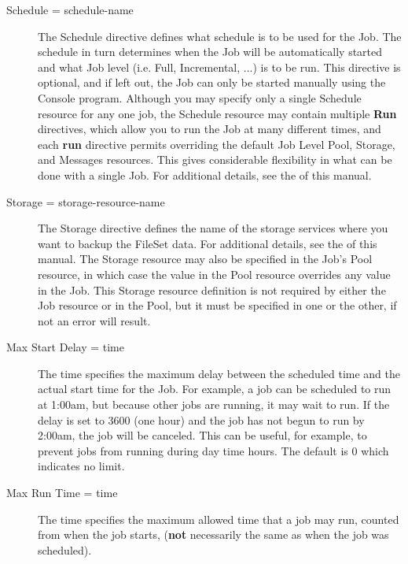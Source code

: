 \begin{description}
\item [Schedule = \lt{}schedule-name\gt{}]
   The Schedule directive defines what schedule is to be used for the Job.
   The schedule in turn determines when the Job will be automatically
   started and what Job level (i.e.  Full, Incremental, ...) is to be run.
   This directive is optional, and if left out, the Job can only be started
   manually using the Console program.  Although you may specify only a
   single Schedule resource for any one job, the Schedule resource may
   contain multiple {\bf Run} directives, which allow you to run the Job at
   many different times, and each {\bf run} directive permits overriding
   the default Job Level Pool, Storage, and Messages resources.  This gives
   considerable flexibility in what can be done with a single Job.  For
   additional details, see the  of this manual.
          

\item [Storage = \lt{}storage-resource-name\gt{}]
   The Storage directive defines the name of the storage services where you
   want to backup the FileSet data.  For additional details, see the
    of this manual.
   The Storage resource may also be specified in the Job's Pool resource,
   in which case the value in the Pool resource overrides any value
   in the Job. This Storage resource definition is not required by either
   the Job resource or in the Pool, but it must be specified in
   one or the other, if not an error will result.

\item [Max Start Delay = \lt{}time\gt{}]
   The time specifies the maximum delay between the scheduled time and the
   actual start time for the Job.  For example, a job can be scheduled to
   run at 1:00am, but because other jobs are running, it may wait to run.
   If the delay is set to 3600 (one hour) and the job has not begun to run
   by 2:00am, the job will be canceled.  This can be useful, for example,
   to prevent jobs from running during day time hours.  The default is 0
   which indicates no limit.

\item [Max Run Time = \lt{}time\gt{}]
   The time specifies the maximum allowed time that a job may run, counted
   from when the job starts, ({\bf not} necessarily the same as when the
   job was scheduled).


\end{description}
